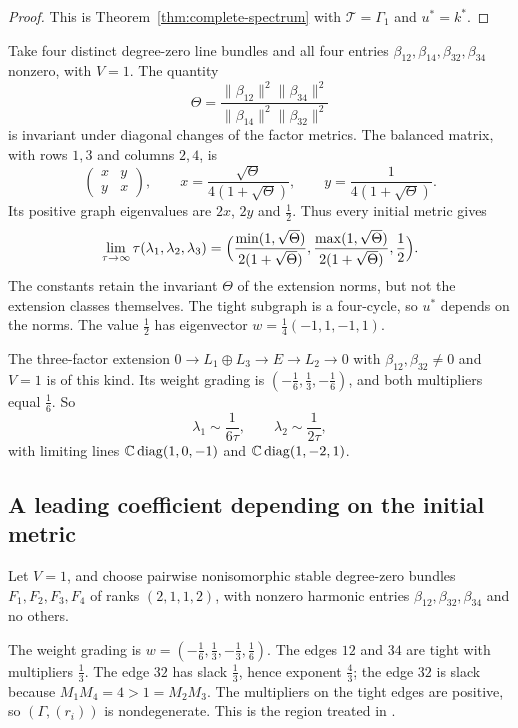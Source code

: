 \begin{proof}
This is Theorem~\ref{thm:complete-spectrum} with $\mathcal T=\Gamma_1$ and $u^*=k^*$.
\end{proof}

\begin{example}\label{ex:four-cycle-flow}
Take four distinct degree-zero line bundles and all four entries
$\beta_{12},\beta_{14},\beta_{32},\beta_{34}$ nonzero, with $V=1$. The
quantity
\[
 \Theta=\frac{\lVert\beta_{12}\rVert^2\lVert\beta_{34}\rVert^2}
             {\lVert\beta_{14}\rVert^2\lVert\beta_{32}\rVert^2}
\]
is invariant under diagonal changes of the factor metrics. The balanced
matrix, with rows $1,3$ and columns $2,4$, is
\[
 \begin{pmatrix}x&y\\y&x\end{pmatrix},\qquad
 x=\frac{\sqrt\Theta}{4(1+\sqrt\Theta)},\qquad
 y=\frac1{4(1+\sqrt\Theta)}.
\]
Its positive graph eigenvalues are $2x$, $2y$ and $\frac12$. Thus every
initial metric gives
\[
 \lim_{\tau\to\infty}\tau(\lambda_1,\lambda_2,\lambda_3)
 =\Bigl(\frac{\min(1,\sqrt\Theta)}{2(1+\sqrt\Theta)},
        \frac{\max(1,\sqrt\Theta)}{2(1+\sqrt\Theta)},\frac12\Bigr).
\]
The constants retain the invariant $\Theta$ of the extension norms, but
not the extension classes themselves. The tight subgraph is a four-cycle,
so $u^*$ depends on the norms. The value $\frac12$ has eigenvector
$w=\frac14(-1,1,-1,1)$.
\end{example}

The three-factor extension $0\to L_1\oplus L_3\to E\to L_2\to0$ with
$\beta_{12},\beta_{32}\ne0$ and $V=1$ is of this kind. Its weight grading
is $(-\frac16,\frac13,-\frac16)$, and both multipliers equal $\frac16$. So
\[
 \lambda_1\sim\frac1{6\tau},\qquad\lambda_2\sim\frac1{2\tau},
\]
with limiting lines $\mathbb C\operatorname{diag}(1,0,-1)$ and $\mathbb C\operatorname{diag}(1,-2,1)$.

\subsection{A leading coefficient depending on the initial metric}

Let $V=1$, and choose pairwise nonisomorphic stable degree-zero bundles
$F_1,F_2,F_3,F_4$ of ranks $(2,1,1,2)$, with nonzero harmonic entries
$\beta_{12},\beta_{32},\beta_{34}$ and no others.

The weight grading is $w=(-\frac16,\frac13,-\frac13,\frac16)$. The edges
$12$ and $34$ are tight with multipliers $\frac13$. The edge $32$ has slack
$\frac13$, hence exponent $\frac43$; the edge $32$ is slack because
$M_1M_4=4>1=M_2M_3$. The multipliers on the tight edges are positive, so
$(\Gamma,(r_i))$ is nondegenerate. This is the region treated in
\cite[(3.24)--(3.26)]{HKKP2023}.

